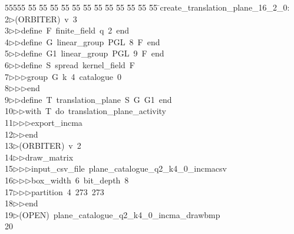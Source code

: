 %
%
\begin{tabbing}
55555 \= 55 \= 55 \= 55 \= 55 \= 55 \= 55 \= 55 \= 55 \= 55 \= 55 \= 55 \= 55 \= \>create\_translation\_plane\_16\_2\_0:\\[0pt]
2\>$\triangleright$\>(ORBITER)\ v\ 3\ \\[0pt]
3\>$\triangleright$\>$\triangleright$\>define\ F\ finite\_field\ q\ 2\ end\ \\[0pt]
4\>$\triangleright$\>$\triangleright$\>define\ G\ linear\_group\ PGL\ 8\ F\ end\ \\[0pt]
5\>$\triangleright$\>$\triangleright$\>define\ G1\ linear\_group\ PGL\ 9\ F\ end\ \\[0pt]
6\>$\triangleright$\>$\triangleright$\>define\ S\ spread\ kernel\_field\ F\ \\[0pt]
7\>$\triangleright$\>$\triangleright$\>$\triangleright$\>group\ G\ k\ 4\ catalogue\ 0\ \\[0pt]
8\>$\triangleright$\>$\triangleright$\>$\triangleright$\>end\ \\[0pt]
9\>$\triangleright$\>$\triangleright$\>define\ T\ translation\_plane\ S\ G\ G1\ end\ \\[0pt]
10\>$\triangleright$\>$\triangleright$\>with\ T\ do\ translation\_plane\_activity\ \\[0pt]
11\>$\triangleright$\>$\triangleright$\>$\triangleright$\>export\_incma\ \\[0pt]
12\>$\triangleright$\>$\triangleright$\>end\\[0pt]
13\>$\triangleright$\>(ORBITER)\ v\ 2\ \\[0pt]
14\>$\triangleright$\>$\triangleright$\>draw\_matrix\ \\[0pt]
15\>$\triangleright$\>$\triangleright$\>$\triangleright$\>input\_csv\_file\ plane\_catalogue\_q2\_k4\_0\_incmacsv\ \\[0pt]
16\>$\triangleright$\>$\triangleright$\>$\triangleright$\>box\_width\ 6\ bit\_depth\ 8\ \\[0pt]
17\>$\triangleright$\>$\triangleright$\>$\triangleright$\>partition\ 4\ 273\ 273\ \\[0pt]
18\>$\triangleright$\>$\triangleright$\>end\\[0pt]
19\>$\triangleright$\>(OPEN)\ plane\_catalogue\_q2\_k4\_0\_incma\_drawbmp\\[0pt]
20\>\end{tabbing}
